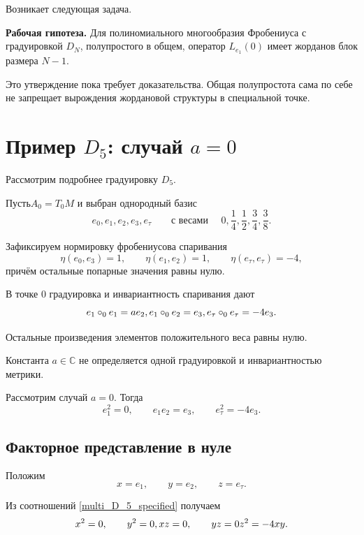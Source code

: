 Возникает следующая задача.

\medskip

\noindent
\textbf{Рабочая гипотеза.}
Для полиномиального многообразия Фробениуса
с градуировкой $D_N$, полупростого в общем,
оператор $L_{e_1}(0)$ имеет жорданов блок
размера $N-1$.

\medskip

Это утверждение пока требует доказательства.
Общая полупростота сама по себе не запрещает
вырождения жордановой структуры в специальной
точке.
\fi
\section{Пример $D_5$: случай $a=0$}

Рассмотрим подробнее градуировку $D_5$.

Пусть\(A_0=T_0M\)
и выбран однородный базис
\[e_0,e_1,e_2,e_3,e_\tau
\qquad
\text{с весами } \quad
0,\frac14,\frac12,\frac34,\frac38.\]

Зафиксируем нормировку фробениусова
спаривания
\[\eta(e_0,e_3)=1,
\qquad
\eta(e_1,e_2)=1,
\qquad
\eta(e_\tau,e_\tau)=-4,\]
причём остальные попарные значения равны нулю.

В точке $0$ градуировка и инвариантность
спаривания дают
\begin{equation}
e_1\circ_0e_1=ae_2,\\
e_1\circ_0e_2=e_3,\\
e_\tau\circ_0e_\tau=-4e_3.\\
\label{multi_D_5}
\end{equation}

Остальные произведения элементов положительного
веса равны нулю.

Константа $a \in \mathbb{C}$ не определяется
одной градуировкой и инвариантностью метрики.

Рассмотрим случай
\(a=0.\)
Тогда
\begin{equation}
e_1^2=0,
\qquad
e_1e_2=e_3,
\qquad
e_\tau^2=-4e_3.
\label{multi_D_5_specified}
\end{equation}

\subsection{Факторное представление в нуле}

Положим
\[
x=e_1,\qquad
y=e_2,\qquad
z=e_\tau.
\]

Из соотношений \ref{multi_D_5_specified} получаем
\begin{equation}
x^2=0,\qquad y^2=0,\\
xz=0,\qquad yz=0\\
z^2=-4xy.
\end{equation}


